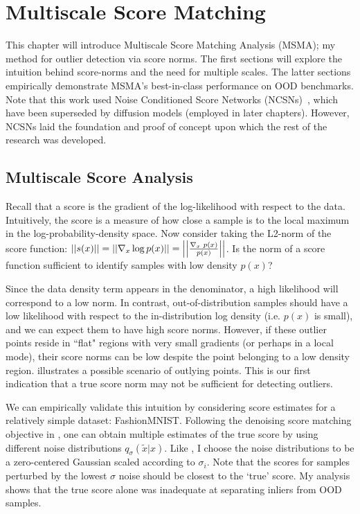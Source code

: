 \chapter{Multiscale Score Matching}
\label{ch:msma}

This chapter will introduce Multiscale Score Matching Analysis (MSMA); my method for outlier detection via score norms. The first sections will explore the intuition behind score-norms and the need for multiple scales. The latter sections empirically demonstrate MSMA's best-in-class performance on OOD benchmarks. Note that this work used Noise Conditioned Score Networks (NCSNs)~\cite{Song2019}, which have been superseded by diffusion models (employed in later chapters). However, NCSNs laid the foundation and proof of concept upon which the rest of the research was developed.

\section{Multiscale Score Analysis}
\label{multiscale}
Recall that a score is the gradient of the log-likelihood with respect to the data. Intuitively, the score is a measure of how close a sample is to the local maximum in the log-probability-density space. Now consider taking the L2-norm of the score function:
$ \left|\left| { s(x) } \right|\right| = \left|\left| { \nabla_{x} \log p(x)  } \right|\right| = \left|\left| { \frac{\nabla_{x}\text{~}p(x)}{p(x)} } \right|\right| $. Is the norm of a score function sufficient to identify samples with low density $p(x)$?

Since the data density term appears in the denominator, a high likelihood will correspond to a low norm. In contrast, out-of-distribution samples should have a low likelihood with respect to the in-distribution log density (i.e. $p(x)$ is small), and we can expect them to have high score norms. However, if these outlier points reside in ``flat" regions with very small gradients (or perhaps in a local mode),  their score norms can be low despite the point belonging to a low density region. 
 illustrates a possible scenario of outlying points.
This is our first indication that a true score norm may not be sufficient for detecting outliers. 

We can empirically validate this intuition by considering score estimates for a relatively simple dataset: FashionMNIST. Following the denoising score matching objective in , one can obtain multiple estimates of the true score by using different noise distributions $q_{\sigma}(\tilde{x}|x)$. Like \cite{Song2019}, I choose the noise distributions to be a zero-centered Gaussian scaled according to $\sigma_i$. Note that the scores for samples perturbed by the lowest $\sigma$ noise should be closest to the `true' score. My analysis shows that the true score alone was inadequate at separating inliers from OOD samples.

